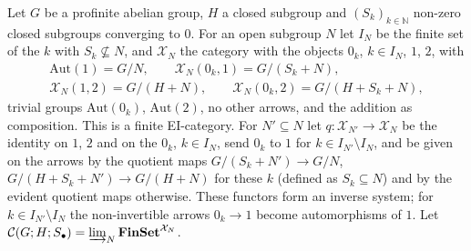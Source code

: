 \documentclass[11pt]{amsart}
\theoremstyle{definition}
\newcommand{\Fin}{\mathbf{FinSet}}
\newcommand{\Aut}{\mathrm{Aut}}
\newcommand{\cX}{\mathcal X}
\newcommand{\cC}{\mathcal C}
\begin{document}
Let $G$ be a profinite abelian group, $H$ a closed subgroup and
$(S_k)_{k\in\mathbb N}$ non-zero closed subgroups converging to $0$.
For an open subgroup $N$ let $I_N$ be the finite set of the $k$ with
$S_k\not\subseteq N$, and $\cX_N$ the category with the objects $0_k$,
$k\in I_N$, $1$, $2$, with
\begin{gather*}
\Aut(1)=G/N,\qquad\cX_N(0_k,1)=G/(S_k+N),\\
\cX_N(1,2)=G/(H+N),\qquad\cX_N(0_k,2)=G/(H+S_k+N),
\end{gather*}
trivial groups $\Aut(0_k)$, $\Aut(2)$, no other arrows, and the
addition as composition. This is a finite EI-category. For $N'\subseteq N$
let $q\colon\cX_{N'}\to\cX_N$ be the identity on $1$, $2$ and on the
$0_k$, $k\in I_N$, send $0_k$ to $1$ for $k\in I_{N'}\setminus I_N$,
and be given on the arrows by the quotient maps $G/(S_k+N')\to G/N$,
$G/(H+S_k+N')\to G/(H+N)$ for these $k$ (defined as $S_k\subseteq N$)
and by the evident quotient maps otherwise. These functors form an
inverse system; for $k\in I_{N'}\setminus I_N$ the non-invertible
arrows $0_k\to1$ become automorphisms of $1$. Let
$\cC(G;H;S_\bullet)=\varinjlim_N\Fin^{\cX_N}$.
\end{document}
